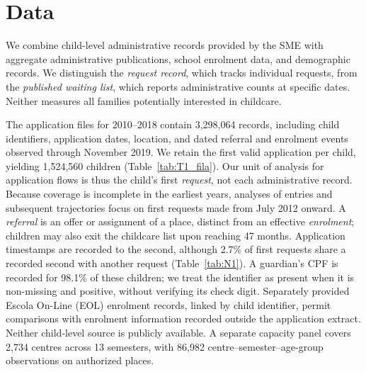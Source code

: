 
\section{Data}\label{sec:data}

We combine child-level administrative records provided by the SME with aggregate administrative publications, school enrolment data, and demographic records. We distinguish the \emph{request record}, which tracks individual requests, from the \emph{published waiting list}, which reports administrative counts at specific dates. Neither measures all families potentially interested in childcare.

The application files for 2010--2018 contain 3,298,064 records, including child identifiers, application dates, location, and dated referral and enrolment events observed through November 2019. We retain the first valid application per child, yielding 1,524,560 children (Table~\ref{tab:T1_fila}). Our unit of analysis for application flows is thus the child's first \emph{request}, not each administrative record. Because coverage is incomplete in the earliest years, analyses of entries and subsequent trajectories focus on first requests made from July 2012 onward. A \emph{referral} is an offer or assignment of a place, distinct from an effective \emph{enrolment}; children may also exit the childcare list upon reaching 47 months. Application timestamps are recorded to the second, although 2.7\% of first requests share a recorded second with another request (Table~\ref{tab:N1}). A guardian's CPF is recorded for 98.1\% of these children; we treat the identifier as present when it is non-missing and positive, without verifying its check digit. Separately provided Escola On-Line (EOL) enrolment records, linked by child identifier, permit comparisons with enrolment information recorded outside the application extract. Neither child-level source is publicly available. A separate capacity panel covers 2,734 centres across 13 semesters, with 86,982 centre--semester--age-group observations on authorized places.

